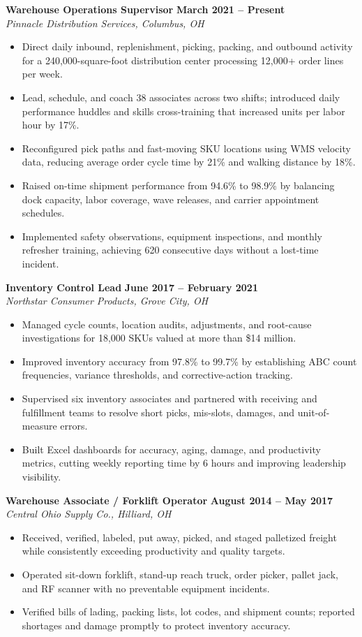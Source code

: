 \documentclass[10pt,letterpaper]{article}
\newcommand{\position}[4]{%
  \textbf{#1} \hfill \textbf{#2}\\[-0.08em]
  \textit{#3} \hfill \textit{#4}\vspace{-0.16em}
}
\begin{document}
\position{Warehouse Operations Supervisor}{March 2021 -- Present}{Pinnacle Distribution Services, Columbus, OH}{}
\begin{itemize}
  \item Direct daily inbound, replenishment, picking, packing, and outbound activity for a 240,000-square-foot distribution center processing 12,000+ order lines per week.
  \item Lead, schedule, and coach 38 associates across two shifts; introduced daily performance huddles and skills cross-training that increased units per labor hour by 17\%.
  \item Reconfigured pick paths and fast-moving SKU locations using WMS velocity data, reducing average order cycle time by 21\% and walking distance by 18\%.
  \item Raised on-time shipment performance from 94.6\% to 98.9\% by balancing dock capacity, labor coverage, wave releases, and carrier appointment schedules.
  \item Implemented safety observations, equipment inspections, and monthly refresher training, achieving 620 consecutive days without a lost-time incident.
\end{itemize}

\position{Inventory Control Lead}{June 2017 -- February 2021}{Northstar Consumer Products, Grove City, OH}{}
\begin{itemize}
  \item Managed cycle counts, location audits, adjustments, and root-cause investigations for 18,000 SKUs valued at more than \$14 million.
  \item Improved inventory accuracy from 97.8\% to 99.7\% by establishing ABC count frequencies, variance thresholds, and corrective-action tracking.
  \item Supervised six inventory associates and partnered with receiving and fulfillment teams to resolve short picks, mis-slots, damages, and unit-of-measure errors.
  \item Built Excel dashboards for accuracy, aging, damage, and productivity metrics, cutting weekly reporting time by 6 hours and improving leadership visibility.
\end{itemize}

\position{Warehouse Associate / Forklift Operator}{August 2014 -- May 2017}{Central Ohio Supply Co., Hilliard, OH}{}
\begin{itemize}
  \item Received, verified, labeled, put away, picked, and staged palletized freight while consistently exceeding productivity and quality targets.
  \item Operated sit-down forklift, stand-up reach truck, order picker, pallet jack, and RF scanner with no preventable equipment incidents.
  \item Verified bills of lading, packing lists, lot codes, and shipment counts; reported shortages and damage promptly to protect inventory accuracy.
\end{itemize}
\end{document}

